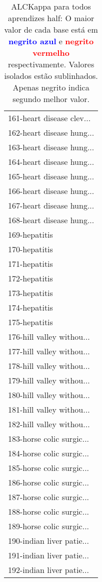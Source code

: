 \begin{table}[h]
\caption{ALCKappa para todos aprendizes half: O maior valor de cada base está em \textcolor{blue}{\textbf{negrito azul}} e \textcolor{red}{\textbf{negrito vermelho}} respectivamente. Valores isolados estão sublinhados. Apenas negrito indica segundo melhor valor.}
\begin{center}\begin{tabular}{l}
 & \\ \hline 161-heart disease clev... &  \\
162-heart disease hung... &  \\
163-heart disease hung... &  \\
164-heart disease hung... &  \\
165-heart disease hung... &  \\
166-heart disease hung... &  \\
167-heart disease hung... &  \\ \hline
168-heart disease hung... &  \\
169-hepatitis &  \\
170-hepatitis &  \\
171-hepatitis &  \\
172-hepatitis &  \\
173-hepatitis &  \\
174-hepatitis &  \\ \hline
175-hepatitis &  \\
176-hill valley withou... &  \\
177-hill valley withou... &  \\
178-hill valley withou... &  \\
179-hill valley withou... &  \\
180-hill valley withou... &  \\
181-hill valley withou... &  \\ \hline
182-hill valley withou... &  \\
183-horse colic surgic... &  \\
184-horse colic surgic... &  \\
185-horse colic surgic... &  \\
186-horse colic surgic... &  \\
187-horse colic surgic... &  \\
188-horse colic surgic... &  \\ \hline
189-horse colic surgic... &  \\
190-indian liver patie... &  \\
191-indian liver patie... &  \\
192-indian liver patie... &  \\\end{tabular}\label{stratsALCKappa5AllReduxHalfb}
\end{center}
\end{table}
